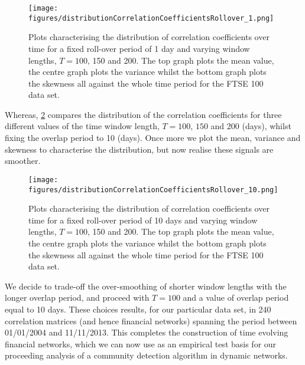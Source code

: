 \begin{figure}
	\centering
	\texttt{[image: figures/distributionCorrelationCoefficientsRollover\_1.png]}
	\caption[Plots characterising the distribution of correlation coefficients for a fixed roll-over period of 1 day and varying window lengths.]{\label{fig:distributionCorrelationCoefficientsRollover1} Plots characterising the distribution of correlation coefficients over time for a fixed roll-over period of 1 day and varying window lengths, $T=100$, 150 and 200. The top graph plots the mean value, the centre graph plots the variance whilst the bottom graph plots the skewness all against the whole time period for the FTSE 100 data set.}
\end{figure}

Whereas, \cref{fig:distributionCorrelationCoefficientsRollover10} compares the distribution of the correlation coefficients for three different values of the time window length, $T=100$, $150$ and $200$ (days), whilst fixing the overlap period to 10 (days).
Once more we plot the mean, variance and skewness to characterise the distribution, but now realise these signals are smoother.

\begin{figure}
	\centering
	\texttt{[image: figures/distributionCorrelationCoefficientsRollover\_10.png]}
	\caption[Plots characterising the distribution of correlation coefficients for a fixed roll-over period of 10 days and varying window lengths.]{\label{fig:distributionCorrelationCoefficientsRollover10} Plots characterising the distribution of correlation coefficients over time for a fixed roll-over period of 10 days and varying window lengths, $T=100$, 150 and 200. The top graph plots the mean value, the centre graph plots the variance whilst the bottom graph plots the skewness all against the whole time period for the FTSE 100 data set.}
\end{figure}

We decide to trade-off the over-smoothing of shorter window lengths with the longer overlap period, and proceed with $T=100$ and a value of overlap period equal to 10 days.
These choices results, for our particular data set, in 240 correlation matrices (and hence financial networks) spanning the period between 01/01/2004 and 11/11/2013.
This completes the construction of time evolving financial networks, which we can now use as an empirical test basis for our proceeding analysis of a community detection algorithm in dynamic networks.

